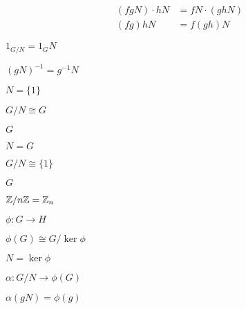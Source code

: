 \documentclass[10pt]{book}
\begin{document}
\begin{mdSnippets}
\begin{mdDisplaySnippet}[26a03d9e65a2b8d6aaa26cf4aa9944a4]
\[\begin{aligned}
(fgN) \cdot hN &= fN \cdot (ghN) \\
(fg)hN &= f(gh)N
\end{aligned}
\]%
\end{mdDisplaySnippet}%
\begin{mdInlineSnippet}[629b2aa7931daf4b58d74507f8b6d449]%
$1_{G/N} = 1_G N$\end{mdInlineSnippet}%
\begin{mdInlineSnippet}[3194bcdadd5113699f06c40a03f0a616]%
$(gN)^{-1} = g^{-1}N$\end{mdInlineSnippet}%
\begin{mdInlineSnippet}[19ad72a75538e72a2190cf9e0f51023d]%
$N = \{1\}$\end{mdInlineSnippet}%
\begin{mdInlineSnippet}[9fa66c314964c96ae34248e41d2da857]%
$G/N \cong G$\end{mdInlineSnippet}%
\begin{mdInlineSnippet}[dfcf28d0734569a6a693bc8194de62bf]%
$G$\end{mdInlineSnippet}%
\begin{mdInlineSnippet}[905ed5ecbb4268c7ff77522650a2073b]%
$N = G$\end{mdInlineSnippet}%
\begin{mdInlineSnippet}[173f39d1f2762a31478e164925f6efe3]%
$G/N \cong \{1\}$\end{mdInlineSnippet}%
\begin{mdInlineSnippet}[dfcf28d0734569a6a693bc8194de62bf]%
$G$\end{mdInlineSnippet}%
\begin{mdInlineSnippet}[988bf92fd48dd2c16a5e63459d7c29eb]%
$\mathbb{Z} / n\mathbb{Z} = \mathbb{Z}_n$\end{mdInlineSnippet}%
\begin{mdInlineSnippet}[245e4b87fe399dd2eb568a0c5e6f914b]%
$\phi: G \to H$\end{mdInlineSnippet}%
\begin{mdInlineSnippet}[2ee68c6c03fb68d35ea48343ce7bb0f5]%
$\phi(G) \cong G / \ker \phi$\end{mdInlineSnippet}%
\begin{mdInlineSnippet}%
$N = \ker \phi$\end{mdInlineSnippet}%
\begin{mdInlineSnippet}[5f4313ef02656084c031841861e4c46e]%
$\alpha: G/N \to \phi(G)$\end{mdInlineSnippet}%
\begin{mdInlineSnippet}[03f9837158354ea379d15c3b8a523f07]%
$\alpha(gN) = \phi(g)$\end{mdInlineSnippet}%

\end{mdSnippets}
\end{document}
